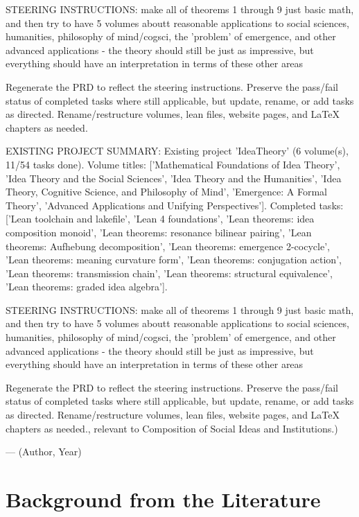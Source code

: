 {STEERING INSTRUCTIONS: make all of theorems 1 through 9 just basic math, and then try to have 5 volumes aboutt reasonable applications to social sciences, humanities, philosophy of mind/cogsci, the 'problem' of emergence, and other advanced applications - the theory should still be just as impressive, but everything should have an interpretation in terms of these other areas

Regenerate the PRD to reflect the steering instructions. Preserve the pass/fail status of completed tasks where still applicable, but update, rename, or add tasks as directed. Rename/restructure volumes, lean files, website pages, and LaTeX chapters as needed.

EXISTING PROJECT SUMMARY: Existing project 'IdeaTheory' (6 volume(s), 11/54 tasks done). Volume titles: ['Mathematical Foundations of Idea Theory', 'Idea Theory and the Social Sciences', 'Idea Theory and the Humanities', 'Idea Theory, Cognitive Science, and Philosophy of Mind', 'Emergence: A Formal Theory', 'Advanced Applications and Unifying Perspectives']. Completed tasks: ['Lean toolchain and lakefile', 'Lean 4 foundations', 'Lean theorems: idea composition monoid', 'Lean theorems: resonance bilinear pairing', 'Lean theorems: Aufhebung decomposition', 'Lean theorems: emergence 2-cocycle', 'Lean theorems: meaning curvature form', 'Lean theorems: conjugation action', 'Lean theorems: transmission chain', 'Lean theorems: structural equivalence', 'Lean theorems: graded idea algebra'].

STEERING INSTRUCTIONS: make all of theorems 1 through 9 just basic math, and then try to have 5 volumes aboutt reasonable applications to social sciences, humanities, philosophy of mind/cogsci, the 'problem' of emergence, and other advanced applications - the theory should still be just as impressive, but everything should have an interpretation in terms of these other areas

Regenerate the PRD to reflect the steering instructions. Preserve the pass/fail status of completed tasks where still applicable, but update, rename, or add tasks as directed. Rename/restructure volumes, lean files, website pages, and LaTeX chapters as needed., relevant to Composition of Social Ideas and Institutions.)}{--- (Author, Year)}

        \section{Background from the Literature}
        \label{sec:v2c3.lit}

